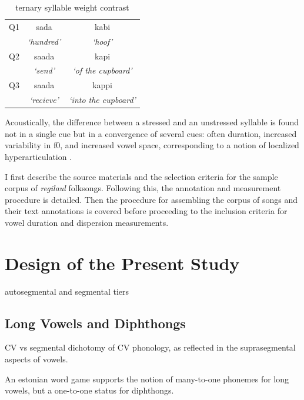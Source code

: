  \begin{table}[htb]
\centering
\begin{tabular}{lcc}
\hline

Q1 &		 sada 		& 	kabi  \\  
	&	 {\it `hundred'} 	&	 {\it`hoof' }\\
\hline
Q2 &		saada 		&	kapi \\
	&	 {\it`send' }		&	{\it`of the cupboard' }		\\
\hline
Q3 &		saada 	&	 kappi 	\\
	&	{\it`recieve' }	&	{\it`into the cupboard' }	\\
\hline
\end{tabular}
\label{qexamps}
\caption{ternary syllable weight contrast}
\end{table}



Acoustically, the difference between a stressed and an unstressed syllable is found not in a single cue but in a convergence of several cues: often duration, increased variability in f0, and increased vowel space, corresponding to a notion of localized hyperarticulation \citep{smiljanicProductionPerceptionClear2005, de1995supraglottal, lindblom1990}. 




I first describe the source materials and the selection criteria for the sample corpus of {\it regilaul} folksongs. Following this, the annotation and measurement procedure is detailed. Then the procedure for assembling the corpus of songs and their text annotations is covered before proceeding to the inclusion criteria for vowel duration and dispersion measurements.


\section{Design of the Present Study}

autosegmental and segmental tiers

\subsection{Long Vowels and Diphthongs}
CV vs segmental dichotomy of CV phonology, as reflected in the suprasegmental aspects of vowels. 

An estonian word game supports the notion of many-to-one phonemes for long vowels, but a one-to-one status for diphthongs.




